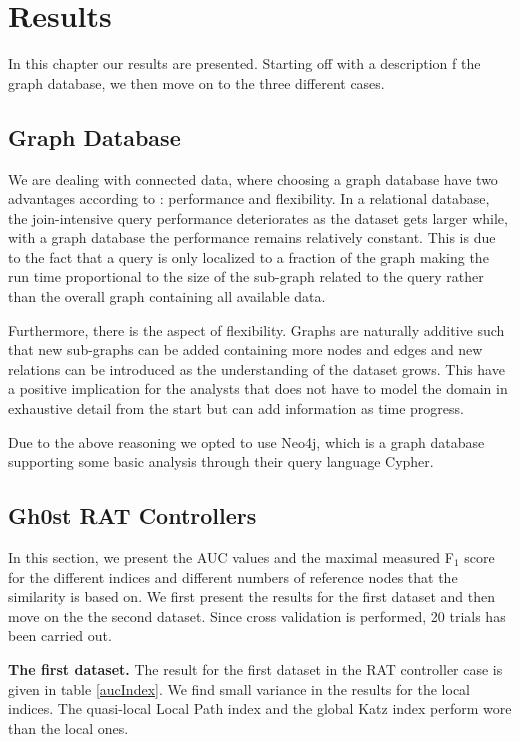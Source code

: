 \chapter{Results}
In this chapter our results are presented. Starting off with a description f the graph database, we then move on to the three different cases. 

\section{Graph Database}
We are dealing with connected data, where choosing a graph database have two advantages according to \citet{robinson2013}: performance and flexibility. In a relational database, the join-intensive query performance deteriorates as the dataset gets larger while, with a graph database the performance remains relatively constant. This is due to the fact that a query is only localized to a fraction of the graph making the run time proportional to the size of the sub-graph related to the query rather than the overall graph containing all available data.

Furthermore, there is the aspect of flexibility. Graphs are naturally additive \cite{robinson2013} such that new sub-graphs can be added containing more nodes and edges and new relations can be introduced as the understanding of the dataset grows. This have a positive implication for the analysts that does not have to model the domain in exhaustive detail from the start but can add information as time progress.

Due to the above reasoning we opted to use Neo4j, which is a graph database supporting some basic analysis through their query language Cypher.

\section{Gh0st RAT Controllers}
In this section, we present the AUC values and the maximal measured F$_1$ score for the different indices and different numbers of reference nodes that the similarity is based on. We first present the results for the first dataset and then move on the the second dataset. Since cross validation is performed, 20 trials has been carried out.

\textbf{The first dataset.} The result for the first dataset in the RAT controller case is given in table \ref{aucIndex}. We find small variance in the results for the local indices. The quasi-local Local Path index and the global Katz index perform wore than the local ones. 

